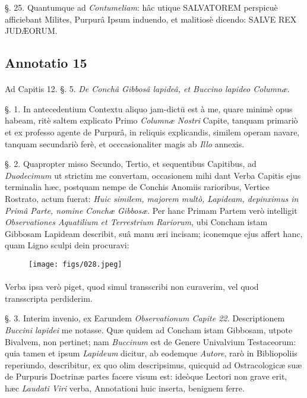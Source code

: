 \documentclass[a4paper, 11pt, oneside, polutonikogreek, german]{article}
\begin{document}
§. 25. Quantumque ad \emph{Contumeliam}: hâc utique SALVATOREM perspicuè afficiebant Milites, Purpurâ Ipsum induendo, et malitiosè dicendo: SALVE REX JUDÆORUM.

\subsection{Annotatio 15}
\paragraph{}
Ad Capitis 12. §. 5. \emph{De Conchâ Gibbosâ lapideâ, et Buccino lapideo Columnæ}.

§. 1. In antecedentium Contextu aliquo jam-dictū est à me, quare minimè opus habeam, ritè saltem explicato Primo \emph{Columnæ Nostri} Capite, tanquam primariò et ex professo agente de Purpurâ, in reliquis explicandis, similem operam navare, tanquam secundariò ferè, et occcasionaliter magis ab \emph{Illo} annexis.

§. 2. Quapropter misso Secundo, Tertio, et sequentibus Capitibus, ad \emph{Duodecimum} ut strictim me convertam, occasionem mihi dant Verba Capitis ejus terminalia hæc, postquam nempe de Conchis Anomiis rarioribus, Vertice Rostrato, actum fuerat: \emph{Huic similem, majorem multò, Lapideam, depinximus in Primâ Parte, nomine Conchæ Gibbosæ}. Per hanc Primam Partem verò intelligit \emph{Observationes Aquatilium et Terrestrium Rariorum}, ubi Concham istam Gibbosam Lapideam describit, suâ manu æri incisam; iconemque ejus affert hanc, quam Ligno sculpi dein procuravi:

\begin{figure}[H]
\centering
\texttt{[image: figs/028.jpeg]}
\end{figure}
\paragraph{}
Verba ipsa verò piget, quod simul transscribi non curaverim, vel quod transscripta perdiderim.

§. 3. Interim invenio, ex Earundem \emph{Observationum Capite 22.} Descriptionem \emph{Buccini lapidei} me notasse. Quæ quidem ad Concham istam Gibbosam, utpote Bivalvem, non pertinet; nam \emph{Buccinum} est de Genere Univalvium Testaceorum: quia tamen et ipsum \emph{Lapideum} dicitur, ab eodemque \emph{Autore}, rarò in Bibliopoliis reperiundo, describitur, ex quo olim descripsimus, quicquid ad Ostracologicæ suæ de Purpuris Doctrinæ partes facere visum est: ideòque Lectori non grave erit, hæc \emph{Laudati Viri} verba, Annotationi huic inserta, benignem ferre.
\end{document}
